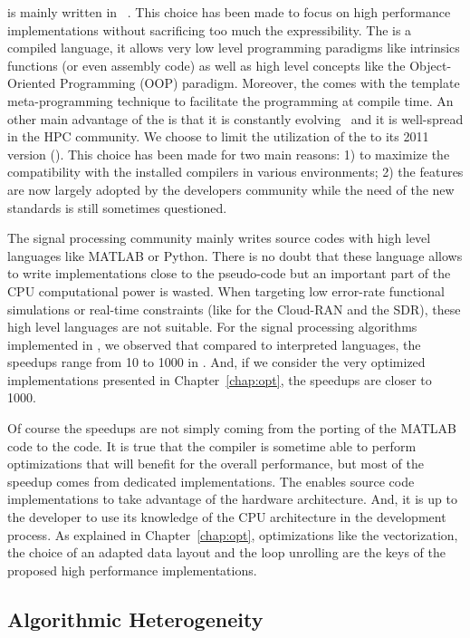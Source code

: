 \AFFECT is mainly written in \Cxx~\cite{Stroustrup2013}. This choice has been
made to focus on high performance implementations without sacrificing too much
the expressibility. The \Cxx is a compiled language, it allows very low level
programming paradigms like intrinsics functions (or even assembly code) as well
as high level concepts like the Object-Oriented Programming (OOP) paradigm.
Moreover, the \Cxx comes with the template meta-programming technique to
facilitate the programming at compile time. An other main advantage of the \Cxx
is that it is constantly evolving~\cite{Stroustrup2020} and it is well-spread in
the HPC community. We choose to limit the utilization of the \Cxx to its 2011
version (). This choice has been made for two main reasons: 1) to
maximize the compatibility with the installed compilers in various environments;
2) the  features are now largely adopted by the developers community
while the need of the new \Cxx standards is still sometimes questioned.

The signal processing community mainly writes source codes with high level
languages like MATLAB or Python. There is no doubt that these language allows
to write implementations close to the pseudo-code but an important part of the
CPU computational power is wasted. When targeting low error-rate functional
simulations or real-time constraints (like for the Cloud-RAN and the SDR), these
high level languages are not suitable. For the signal processing algorithms
implemented in \AFFECT, we observed that compared to interpreted languages, the
speedups range from 10 to 1000 in \Cxx. And, if we consider the very optimized
implementations presented in Chapter~\ref{chap:opt}, the speedups are closer to
1000.

Of course the speedups are not simply coming from the porting of the MATLAB
code to the \Cxx code. It is true that the compiler is sometime able to perform
optimizations that will benefit for the overall performance, but most of the
speedup comes from dedicated implementations. The \Cxx enables source code
implementations to take advantage of the hardware architecture. And, it is up
to the developer to use its knowledge of the CPU architecture in the development
process. As explained in Chapter~\ref{chap:opt}, optimizations like the
vectorization, the choice of an adapted data layout and the loop unrolling are
the keys of the proposed high performance implementations.

\subsection{Algorithmic Heterogeneity}

